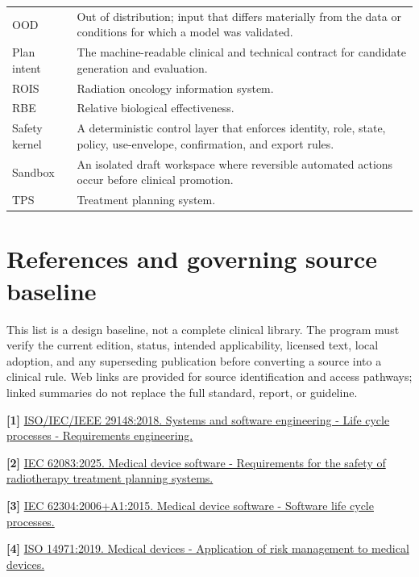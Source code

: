 \documentclass[11pt,letterpaper]{article}
\begin{document}
\begin{small}
\begin{longtable}{@{}L{0.1769\textwidth}L{0.7431\textwidth}@{}}
\addlinespace[2pt]
OOD & Out of distribution; input that differs materially from the data or conditions for which a model was validated. \\
\addlinespace[2pt]
Plan intent & The machine-readable clinical and technical contract for candidate generation and evaluation. \\
\addlinespace[2pt]
ROIS & Radiation oncology information system. \\
\addlinespace[2pt]
RBE & Relative biological effectiveness. \\
\addlinespace[2pt]
Safety kernel & A deterministic control layer that enforces identity, role, state, policy, use-envelope, confirmation, and export rules. \\
\addlinespace[2pt]
Sandbox & An isolated draft workspace where reversible automated actions occur before clinical promotion. \\
\addlinespace[2pt]
TPS & Treatment planning system. \\
\end{longtable}
\end{small}

\section{References and governing source baseline}

This list is a design baseline, not a complete clinical library. The program must verify the current edition, status, intended applicability, licensed text, local adoption, and any superseding publication before converting a source into a clinical rule. Web links are provided for source identification and access pathways; linked summaries do not replace the full standard, report, or guideline.

\textbf{[1] }\href{\detokenize{https://www.iso.org/standard/72089.html}}{ISO\slash\allowbreak{}IEC\slash\allowbreak{}IEEE 29148:2018. Systems and software engineering - Life cycle processes - Requirements engineering.}

\textbf{[2] }\href{\detokenize{https://webstore.iec.ch/en/publication/90143}}{IEC 62083:2025. Medical device software - Requirements for the safety of radiotherapy treatment planning systems.}

\textbf{[3] }\href{\detokenize{https://webstore.iec.ch/en/publication/22794}}{IEC 62304:2006+A1:2015. Medical device software - Software life cycle processes.}

\textbf{[4] }\href{\detokenize{https://www.iso.org/standard/72704.html}}{ISO 14971:2019. Medical devices - Application of risk management to medical devices.}
\end{document}
